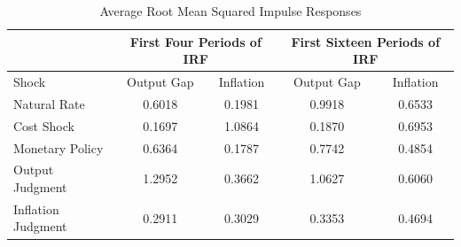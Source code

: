\documentclass[12pt]{article}
\begin{document}
{\begin{table}\caption{Average Root Mean Squared Impulse Responses}\label{tb:averms}
\begin{center}
\begin{tabular}{l|c|c||c|c}
 \multicolumn{1}{c}{} & \multicolumn{2}{c||}{First Four Periods of IRF} & \multicolumn{2}{c}{First Sixteen Periods of IRF} \\ \hline
 Shock & Output Gap & Inflation & Output Gap & Inflation \\ \hline 
Natural Rate & 0.6018 & 0.1981 & 0.9918 & 0.6533 \\ 
Cost Shock & 0.1697 & 1.0864 & 0.1870 & 0.6953 \\ 
Monetary Policy & 0.6364 & 0.1787 & 0.7742 & 0.4854 \\ 
Output Judgment & 1.2952 & 0.3662 & 1.0627 & 0.6060 \\ 
Inflation Judgment & 0.2911 & 0.3029 & 0.3353 & 0.4694 \\ 
\hline
\end{tabular}
\end{center}
\end{table}


}
\end{document}
